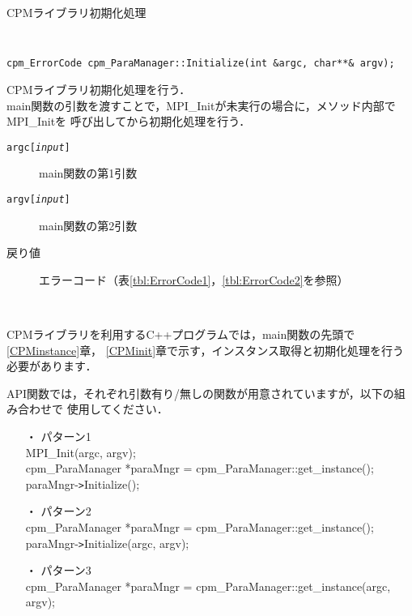 \begin{spacing}{0.8}
\begin{itembox}[l]{CPMライブラリ初期化処理}
{\tt
\begin{verbatim}
cpm_ErrorCode cpm_ParaManager::Initialize(int &argc, char**& argv);
\end{verbatim}
}
CPMライブラリ初期化処理を行う．\\
main関数の引数を渡すことで，MPI\_Initが未実行の場合に，メソッド内部でMPI\_Initを
呼び出してから初期化処理を行う．
\begin{description}
\item[{\tt argc[{\it input}]}] main関数の第1引数
\item[{\tt argv[{\it input}]}] main関数の第2引数
\\
\item[戻り値] エラーコード（表\ref{tbl:ErrorCode1}，\ref{tbl:ErrorCode2}を参照）
\end{description}
\end{itembox}\\
\end{spacing}

CPMライブラリを利用するC++プログラムでは，main関数の先頭で\ref{CPMinstance}章，
\ref{CPMinit}章で示す，インスタンス取得と初期化処理を行う必要があります．
\par
API関数では，それぞれ引数有り/無しの関数が用意されていますが，以下の組み合わせで
使用してください．

\begin{spacing}{0.8}
\begin{itemize}
\item[・] {パターン1}\\
MPI\_Init(argc, argv);\\
cpm\_ParaManager *paraMngr = cpm\_ParaManager::get\_instance();\\
paraMngr-\verb|>|Initialize();\\
\item[・] {パターン2}\\
cpm\_ParaManager *paraMngr = cpm\_ParaManager::get\_instance();\\
paraMngr-\verb|>|Initialize(argc, argv);\\
\item[・] {パターン3}\\
cpm\_ParaManager *paraMngr = cpm\_ParaManager::get\_instance(argc, argv);\\
\end{itemize}
\end{spacing}


